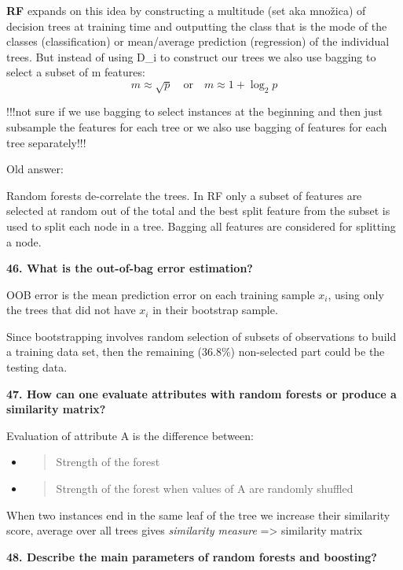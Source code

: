 \textbf{RF} expands on this idea by constructing a multitude (set aka
množica) of decision trees at training time and outputting the class
that is the mode of the classes (classification) or mean/average
prediction (regression) of the individual trees. But instead of using
D\_i to construct our trees we also use bagging to select a subset of m
features:
\[ m \approx \sqrt{p} \quad \text{or} \quad m \approx 1 + \log_2 p \]

!!!not sure if we use bagging to select instances at the beginning and
then just subsample the features for each tree or we also use bagging of
features for each tree separately!!!

Old answer:

Random forests de-correlate the trees. In RF only a subset of features
are selected at random out of the total and the best split feature from
the subset is used to split each node in a tree. Bagging all features
are considered for splitting a node.

\textbf{46. What is the out-of-bag error estimation?}

OOB error is the mean prediction error on each training sample $x_i$, using
only the trees that did not have $x_i$ in their bootstrap sample.

Since bootstrapping involves random selection of subsets of observations
to build a training data set, then the remaining (36.8\%) non-selected
part could be the testing data.

\textbf{47. How can one evaluate attributes with random forests or
produce a similarity matrix?}

Evaluation of attribute A is the difference between:

\begin{itemize}
\item
  \begin{quote}
  Strength of the forest
  \end{quote}
\item
  \begin{quote}
  Strength of the forest when values of A are randomly shuffled
  \end{quote}
\end{itemize}

When two instances end in the same leaf of the tree we increase their
similarity score, average over all trees gives \emph{similarity measure}
=\textgreater{} similarity matrix

\textbf{48. Describe the main parameters of random forests and
boosting?}

